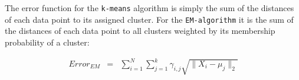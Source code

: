 \documentclass[a4paper, 12pt, titlepage]{article}
\begin{document}
The error function for the \texttt{k-means} algorithm is simply the sum of the distances of each data point to its assigned cluster.
For the \texttt{EM-algorithm} it is the sum of the distances of each data point to all clusters weighted by its membership probability of a cluster:

\begin{eqnarray*}
	Error_{EM} &=& \sum_{i=1}^N \sum_{j=1}^k \gamma_{i,j} \sqrt{\lVert X_i-\mu_j \rVert_2}
\end{eqnarray*}

\begin{figure}
	\centering
	\\

\end{figure}
\end{document}
